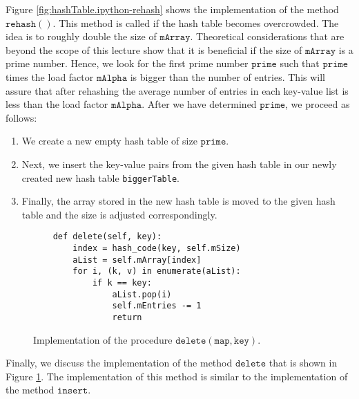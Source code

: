 Figure \ref{fig:hashTable.ipython-rehash} shows the implementation of the method
$\texttt{rehash}()$.  This method is called if the hash table becomes overcrowded.  The idea is to
roughly double the size of $\texttt{mArray}$.  Theoretical considerations that are  beyond the scope
of this lecture show that it is beneficial if the size of $\texttt{mArray}$ is a prime number.
Hence, we look for the first prime number $\texttt{prime}$ such that $\texttt{prime}$ times the load
factor $\texttt{mAlpha}$ is bigger than the
number of entries.  This will assure that after rehashing the average number of entries in each key-value
list is less than the load factor $\texttt{mAlpha}$.  After we have determined $\texttt{prime}$, we
proceed as follows: 
\begin{enumerate}
\item We create a new empty hash table of size $\texttt{prime}$.
\item Next, we insert the key-value pairs from the given hash table in our newly created new hash table
      \texttt{biggerTable}.
\item Finally, the array stored in the new hash table is moved to the given hash table
      and the size is adjusted correspondingly.
\end{enumerate}

\begin{figure}[!ht]
\centering
\begin{verbatim}
    def delete(self, key):
        index = hash_code(key, self.mSize)
        aList = self.mArray[index]
        for i, (k, v) in enumerate(aList):
            if k == key:
                aList.pop(i)
                self.mEntries -= 1
                return 
\end{verbatim}
\vspace*{-0.3cm}
\caption{Implementation of the procedure $\texttt{delete}(\texttt{map}, \texttt{key})$.}
\label{fig:HashMap.ipynb-delete}
\end{figure}

Finally, we discuss the implementation of the method $\texttt{delete}$ that is shown in Figure
\ref{fig:HashMap.ipynb-delete}.  The implementation of this method is similar to the implementation
of the method $\texttt{insert}$.   

